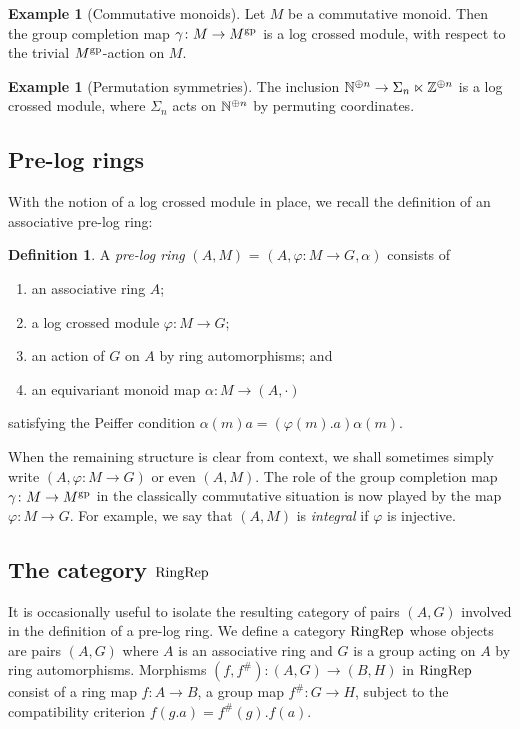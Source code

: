 \documentclass[a4paper,10pt%
]{amsart}
\numberwithin{equation}{section}
\theoremstyle{definition}
\newtheorem{definition}[subsection]{Definition}
\newtheorem{example}[subsection]{Example}
\renewcommand{\:}{\colon}
\begin{document}
\begin{example}[Commutative monoids] Let $M$ be a commutative monoid. Then the group completion map $\gamma \colon M \to M^{\rm gp}$ is a log crossed module, with respect to the trivial $M^{\rm gp}$-action on $M$. 
\end{example}

\begin{example}[Permutation symmetries]\label{ex:permsymm} The inclusion ${\Bbb N}^{\oplus n} \to \Sigma_n \ltimes {\Bbb Z}^{\oplus n}$ is a log crossed module, where $\Sigma_n$ acts on ${\Bbb N}^{\oplus n}$ by permuting coordinates. 
\end{example}

\subsection{Pre-log rings} With the notion of a log crossed module in place, we recall the definition of an associative pre-log ring: 

\begin{definition}\label{def:prelogmaintext} A \emph{pre-log ring} $(A, M)$ = $(A, \varphi \colon M \to G, \alpha)$ consists of 
    
    \begin{enumerate} \item an associative ring $A$; \item a log crossed module $\varphi \colon M \to G$; \item an action of $G$ on $A$ by ring automorphisms; and \item an equivariant monoid map $\alpha \colon M \to (A, \cdot)$ 
    \end{enumerate}
\noindent satisfying the Peiffer condition $\alpha(m)a = (\varphi(m).a)\alpha(m)$.
\end{definition}

When the remaining structure is clear from context, we shall sometimes simply write $(A, \varphi \colon M \to G)$ or even $(A, M)$. The role of the group completion map $\gamma \colon M \to M^{\rm gp}$ in the classically commutative situation is now played by the map $\varphi \colon M \to G$. For example, we say that $(A, M)$ is \emph{integral} if $\varphi$ is injective. 

\subsection{The category ${\rm RingRep}$} It is occasionally useful to isolate the resulting category of pairs $(A, G)$ involved in the definition of a pre-log ring. We define a category ${\rm RingRep}$ whose objects are pairs $(A, G)$ where $A$ is an associative ring and $G$ is a group acting on $A$ by ring automorphisms. Morphisms $(f, f^\#) \colon (A, G) \to (B, H)$ in ${\rm RingRep}$ consist of a ring map $f \colon A \to B$, a group map $f^\# \colon G \to H$, subject to the compatibility criterion $f(g.a) = f^\#(g).f(a)$. 
\end{document}
